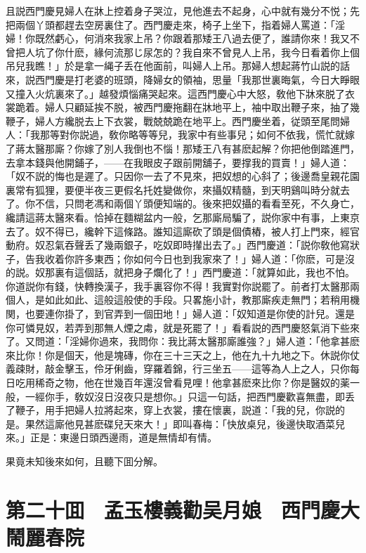 且説西門慶見婦人在牀上控着身子哭泣，見他進去不起身，心中就有幾分不悦；先把兩個丫頭都趕去空房裏住了。西門慶走來，椅子上坐下，指着婦人罵道：「淫婦！你既然虧心，何消來我家上吊？你跟着那矮王八過去便了，誰請你來！我又不曾把人坑了你什麽，緣何流那じ尿怎的？我自來不曾見人上吊，我今日看着你上個吊兒我瞧！」於是拿一䋲子丢在他面前，叫婦人上吊。那婦人想起蔣竹山説的話來，説西門慶是打老婆的班頭，降婦女的領袖，思量「我那世裏晦氣，今日大睜眼又撞入火炕裏來了。」越發煩惱痛哭起來。這西門慶心中大怒，敎他下牀來脱了衣裳跪着。婦人只顧延挨不脱，被西門慶拖翻在牀地平上，袖中取出鞭子來，抽了幾鞭子，婦人方纔脱去上下衣裳，戰兢兢跪在地平上。西門慶坐着，従頭至尾問婦人：「我那等對你説過，敎你略等等兒，我家中有些事兒；如何不依我，慌忙就嫁了蔣太醫那廝？你嫁了別人我倒也不惱！那矮王八有甚麽起解？你把他倒踏進門，去拿本錢與他開鋪子，——在我眼皮子跟前開舖子，要撑我的買賣！」婦人道：「奴不説的悔也是遲了。只因你一去了不見來，把奴想的心斜了；後邊喬皇親花園裏常有狐狸，要便半夜三更假名托姓變做你，來攝奴精髓，到天明鷄叫時分就去了。你不信，只問老馮和兩個丫頭便知端的。後來把奴攝的看看至死，不久身亡，纔請這蔣太醫來看。恰掉在麵糊盆内一般，乞那廝局騙了，説你家中有事，上東京去了。奴不得已，纔幹下這條路。誰知這廝砍了頭是個債樁，被人打上門來，經官動府。奴忍氣吞聲丢了幾兩銀子，吃奴即時攆出去了。」西門慶道：「説你敎他寫狀子，告我收着你許多東西；你如何今日也到我家來了！」婦人道：「你麽，可是沒的説。奴那裏有這個話，就把身子爛化了！」西門慶道：「就算如此，我也不怕。你道説你有錢，快轉換漢子，我手裏容你不得！我實對你説罷了。前者打太醫那兩個人，是如此如此、這般這般使的手段。只畧施小計，教那廝疾走無門；若稍用機関，也要連你掛了，到官弄到一個田地！」婦人道：「奴知道是你使的計兒。還是你可憐見奴，若弄到那無人煙之䖏，就是死罷了！」看看説的西門慶怒氣消下些來了。又問道：「淫婦你過來，我問你：我比蔣太醫那廝誰強？」婦人道：「他拿甚麽來比你！你是個天，他是塊磚，你在三十三天之上，他在九十九地之下。休説你仗義疎財，敲金擊玉，伶牙俐齒，穿羅着錦，行三坐五——這等為人上之人，只你每日吃用稀奇之物，他在世幾百年還沒曾看見哩！他拿甚麽來比你？你是醫奴的薬一般，一經你手，敎奴沒日沒夜只是想你。」只這一句話，把西門慶歡喜無盡，即丢了鞭子，用手把婦人拉將起來，穿上衣裳，摟在懷裏，説道：「我的兒，你説的是。果然這廝他見甚麽碟兒天來大！」即叫春梅：「快放桌兒，後邊快取酒菜兒來。」正是：東邊日頭西邊雨，道是無情却有情。

果竟未知後來如何，且聽下囬分解。

\chapter*{第二十囬　孟玉樓義勸吴月娘　西門慶大鬧麗春院}

